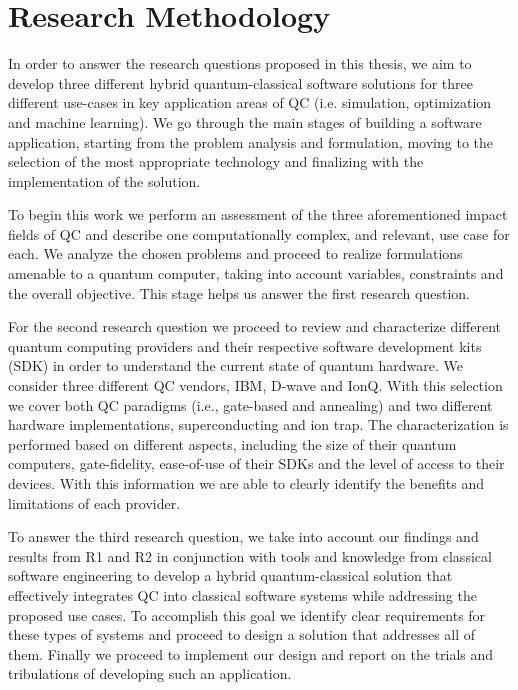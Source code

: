 \section{Research Methodology}
\label{sect:introduction--research-methodology}

In order to answer the research questions proposed in this thesis, we aim to develop three different hybrid quantum-classical software solutions for three different use-cases in key application areas of QC (i.e. simulation, optimization and machine learning). We go through the main stages of building a software application, starting from the problem analysis and formulation, moving to the selection of the most appropriate technology and finalizing with the implementation of the solution.

To begin this work we perform an assessment of the three aforementioned impact fields of QC and describe one computationally complex, and relevant, use case for each. We analyze the chosen problems and proceed to realize formulations amenable to a quantum computer, taking into account variables, constraints and the overall objective. This stage helps us answer the first research question.

For the second research question we proceed to review and characterize different quantum computing providers and their respective software development kits (SDK) in order to understand the current state of quantum hardware. We consider three different QC vendors, IBM, D-wave and IonQ. With this selection we cover both QC paradigms (i.e., gate-based and annealing) and two different hardware implementations, superconducting and ion trap. The characterization is performed based on different aspects, including the size of their quantum computers, gate-fidelity, ease-of-use of their SDKs and the level of access to their devices. With this information we are able to clearly identify the benefits and limitations of each provider.

To answer the third research question, we take into account our findings and results from R1 and R2 in conjunction with tools and knowledge from classical software engineering to develop a hybrid quantum-classical solution that effectively integrates QC into classical software systems while addressing the proposed use cases. To accomplish this goal we identify clear requirements for these types of systems and proceed to design a solution that addresses all of them. Finally we proceed to implement our design and report on the trials and tribulations of developing such an application. 

